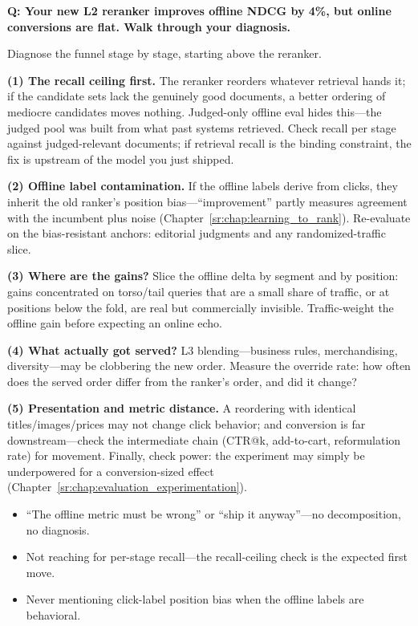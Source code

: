 \begin{interviewq}
\textbf{Q: Your new L2 reranker improves offline NDCG by 4\%, but online conversions are flat. Walk through your diagnosis.}

 \quad {} \quad \badgefreq{\freqhigh}

\stronganswer

Diagnose the funnel stage by stage, starting above the reranker.

\textbf{(1) The recall ceiling first.} The reranker reorders whatever retrieval hands it; if the candidate sets lack the genuinely good documents, a better ordering of mediocre candidates moves nothing. Judged-only offline eval hides this---the judged pool was built from what past systems retrieved. Check recall per stage against judged-relevant documents; if retrieval recall is the binding constraint, the fix is upstream of the model you just shipped.

\textbf{(2) Offline label contamination.} If the offline labels derive from clicks, they inherit the old ranker's position bias---``improvement'' partly measures agreement with the incumbent plus noise (Chapter~\ref{sr:chap:learning_to_rank}). Re-evaluate on the bias-resistant anchors: editorial judgments and any randomized-traffic slice.

\textbf{(3) Where are the gains?} Slice the offline delta by segment and by position: gains concentrated on torso/tail queries that are a small share of traffic, or at positions below the fold, are real but commercially invisible. Traffic-weight the offline gain before expecting an online echo.

\textbf{(4) What actually got served?} L3 blending---business rules, merchandising, diversity---may be clobbering the new order. Measure the override rate: how often does the served order differ from the ranker's order, and did it change?

\textbf{(5) Presentation and metric distance.} A reordering with identical titles/images/prices may not change click behavior; and conversion is far downstream---check the intermediate chain (CTR@k, add-to-cart, reformulation rate) for movement. Finally, check power: the experiment may simply be underpowered for a conversion-sized effect (Chapter~\ref{sr:chap:evaluation_experimentation}).

\redflags
\begin{itemize}
    \item ``The offline metric must be wrong'' or ``ship it anyway''---no decomposition, no diagnosis.
    \item Not reaching for per-stage recall---the recall-ceiling check is the expected first move.
    \item Never mentioning click-label position bias when the offline labels are behavioral.
\end{itemize}


\end{interviewq}
